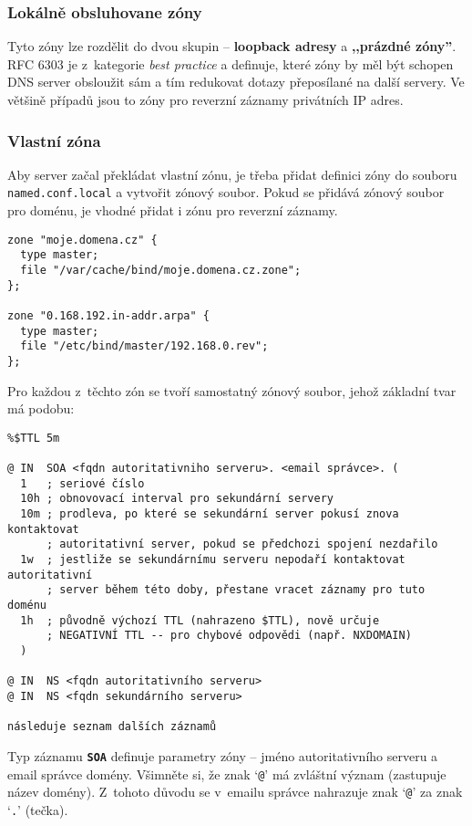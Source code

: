 \subsubsection{Lokálně obsluhovane zóny}
Tyto zóny lze rozdělit do dvou skupin -- {\bf loopback adresy} a {\bf ,,prázdné zóny''}. RFC 6303
\cite{rfc6303} je z~kategorie {\em best practice} a definuje, které zóny by měl být schopen DNS server
obsloužit sám a tím redukovat dotazy přeposílané na další servery. Ve většině případů jsou to zóny pro reverzní záznamy privátních IP adres.


\subsubsection{Vlastní zóna}
Aby server začal překládat vlastní zónu, je třeba přidat definici zóny do souboru {\tt named.conf.local} a vytvořit zónový soubor. Pokud se přidává zónový soubor pro doménu, je vhodné přidat i zónu pro reverzní záznamy.

\begin{verbatim}
zone "moje.domena.cz" {
  type master;
  file "/var/cache/bind/moje.domena.cz.zone";
};

zone "0.168.192.in-addr.arpa" {
  type master;
  file "/etc/bind/master/192.168.0.rev";
};
\end{verbatim}

Pro každou z~těchto zón se tvoří samostatný zónový soubor, jehož základní tvar má podobu:

\begin{verbatim}
%$TTL 5m

@ IN  SOA <fqdn autoritativniho serveru>. <email správce>. (
  1   ; seriové číslo
  10h ; obnovovací interval pro sekundární servery
  10m ; prodleva, po které se sekundární server pokusí znova kontaktovat
      ; autoritativní server, pokud se předchozi spojení nezdařilo
  1w  ; jestliže se sekundárnímu serveru nepodaří kontaktovat autoritativní
      ; server během této doby, přestane vracet záznamy pro tuto doménu
  1h  ; původně výchozí TTL (nahrazeno $TTL), nově určuje
      ; NEGATIVNÍ TTL -- pro chybové odpovědi (např. NXDOMAIN)
  )

@ IN  NS <fqdn autoritativního serveru>
@ IN  NS <fqdn sekundárního serveru>

následuje seznam dalších záznamů
\end{verbatim}
Typ záznamu {\tt\bf SOA} definuje parametry zóny -- jméno autoritativního serveru a email správce domény. Všimněte si, že znak `{\tt @}' má zvláštní význam (zastupuje název domény). Z~tohoto důvodu se v~emailu správce nahrazuje znak `{\tt @}' za znak `{\tt .}' (tečka).

